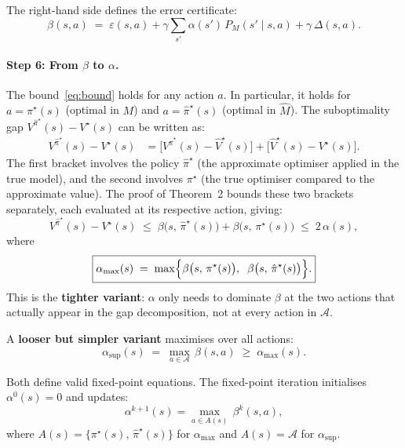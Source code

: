 \documentclass[11pt]{article}
\newcommand{\pistar}{\pi^\star}
\newcommand{\pihatstar}{\hat\pi^\star}
\newcommand{\Vstar}{V^\star}
\newcommand{\Vhatstar}{\hat V^\star}
\newcommand{\Vpihat}{V^{\pihatstar}}
\begin{document}
The right-hand side defines the error certificate:
\begin{equation}\label{eq:beta-def}
  \beta(s,a)
  \;=\; \varepsilon(s,a)
  + \gamma \sum_{s'} \alpha(s')\, P_M(s' \mid s, a)
  + \gamma\,\Delta(s,a).
\end{equation}

\paragraph{Step 6: From $\beta$ to $\alpha$.}
The bound~\eqref{eq:bound} holds for any action $a$.  In particular, it holds
for $a = \pistar(s)$ (optimal in $M$) and $a = \pihatstar(s)$ (optimal in
$\hat M$).  The suboptimality gap $\Vpihat(s) - \Vstar(s)$ can be written as:
\begin{align*}
  \Vpihat(s) - \Vstar(s)
  &= \bigl[\Vpihat(s) - \Vhatstar(s)\bigr]
   + \bigl[\Vhatstar(s) - \Vstar(s)\bigr].
\end{align*}
The first bracket involves the policy $\pihatstar$ (the approximate
optimiser applied in the true model), and the second involves $\pistar$
(the true optimiser compared to the approximate value).  The proof of
Theorem~2 bounds these two brackets separately, each evaluated at its
respective action, giving:
\begin{equation}\label{eq:gap-two-actions}
  \Vpihat(s) - \Vstar(s)
  \;\le\; \beta\bigl(s,\, \pihatstar(s)\bigr) + \beta\bigl(s,\, \pistar(s)\bigr)
  \;\le\; 2\,\alpha(s),
\end{equation}
where
\begin{equation}\label{eq:alpha-max}
  \boxed{%
    \alpha_{\max}(s)
    \;=\; \max\!\Big\{
      \beta\bigl(s,\, \pistar(s)\bigr),\;\;
      \beta\bigl(s,\, \pihatstar(s)\bigr)
    \Big\}.
  }
\end{equation}
This is the \textbf{tighter variant}: $\alpha$ only needs to dominate $\beta$
at the two actions that actually appear in the gap decomposition, not at every
action in $\mathcal{A}$.

A \textbf{looser but simpler variant} maximises over all actions:
\begin{equation}\label{eq:alpha-sup}
  \alpha_{\sup}(s)
  \;=\; \max_{a \in \mathcal{A}}\, \beta(s, a)
  \;\ge\; \alpha_{\max}(s).
\end{equation}

Both define valid fixed-point equations.  The fixed-point iteration
initialises $\alpha^0(s) = 0$ and updates:
\[
  \alpha^{k+1}(s) = \max_{a \in A(s)}\, \beta^k(s,a),
\]
where $A(s) = \{\pistar(s),\, \pihatstar(s)\}$ for $\alpha_{\max}$
and $A(s) = \mathcal{A}$ for $\alpha_{\sup}$.
\end{document}
